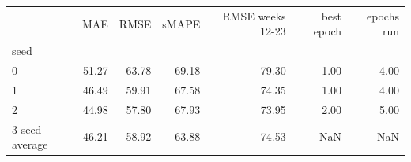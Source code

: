 \begin{tabular}{lrrrrrr}
\toprule
 & MAE & RMSE & sMAPE & RMSE weeks 12-23 & best epoch & epochs run \\
seed &  &  &  &  &  &  \\
\midrule
0 & 51.27 & 63.78 & 69.18 & 79.30 & 1.00 & 4.00 \\
1 & 46.49 & 59.91 & 67.58 & 74.35 & 1.00 & 4.00 \\
2 & 44.98 & 57.80 & 67.93 & 73.95 & 2.00 & 5.00 \\
3-seed average & 46.21 & 58.92 & 63.88 & 74.53 & NaN & NaN \\
\bottomrule
\end{tabular}
